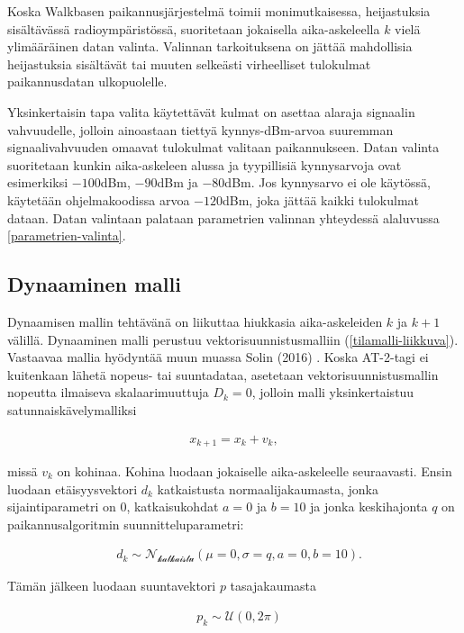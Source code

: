 \documentclass[
  12pt,
  a4paper, twoside]{book}
\begin{document}
Koska Walkbasen paikannusjärjestelmä toimii monimutkaisessa, heijastuksia sisältävässä radioympäristössä, suoritetaan jokaisella aika-askeleella \(k\) vielä ylimääräinen datan valinta. Valinnan tarkoituksena on jättää mahdollisia heijastuksia sisältävät tai muuten selkeästi virheelliset tulokulmat paikannusdatan ulkopuolelle.

Yksinkertaisin tapa valita käytettävät kulmat on asettaa alaraja signaalin vahvuudelle, jolloin ainoastaan tiettyä kynnys-dBm-arvoa suuremman signaalivahvuuden omaavat tulokulmat valitaan paikannukseen. Datan valinta suoritetaan kunkin aika-askeleen alussa ja tyypillisiä kynnysarvoja ovat esimerkiksi \(-100\)dBm, \(-90\)dBm ja \(-80\)dBm. Jos kynnysarvo ei ole käytössä, käytetään ohjelmakoodissa arvoa \(-120\)dBm, joka jättää kaikki tulokulmat dataan. Datan valintaan palataan parametrien valinnan yhteydessä alaluvussa \ref{parametrien-valinta}.

\hypertarget{dynaaminen-malli}{%
\subsection{Dynaaminen malli}\label{dynaaminen-malli}}

Dynaamisen mallin tehtävänä on liikuttaa hiukkasia aika-askeleiden \(k\) ja \(k+1\) välillä. Dynaaminen malli perustuu vektorisuunnistusmalliin (\ref{tilamalli-liikkuva}). Vastaavaa mallia hyödyntää muun muassa Solin (2016) \citep{Solin-2016}. Koska AT-2-tagi ei kuitenkaan lähetä nopeus- tai suuntadataa, asetetaan vektorisuunnistusmallin nopeutta ilmaiseva skalaarimuuttuja \(D_k=0\), jolloin malli yksinkertaistuu satunnaiskävelymalliksi

\begin{align}\label{dynaaminen-malli-empiirinen}
x_{k+1}=x_k + v_k,
\end{align}

\noindent missä \(v_k\) on kohinaa. Kohina luodaan jokaiselle aika-askeleelle seuraavasti. Ensin luodaan etäisyysvektori \(d_k\) katkaistusta normaalijakaumasta, jonka sijaintiparametri on 0, katkaisukohdat \(a=0\) ja \(b=10\) ja jonka keskihajonta \(q\) on paikannusalgoritmin suunnitteluparametri:

\begin{align}
&d_k \sim \mathcal{N_{\text{katkaistu}}}(\mu=0, \sigma=q, a=0, b=10).
\end{align}

Tämän jälkeen luodaan suuntavektori \(p\) tasajakaumasta

\begin{align}
&p_k\sim\mathcal{U}(0, 2 \pi)
\end{align}
\end{document}
